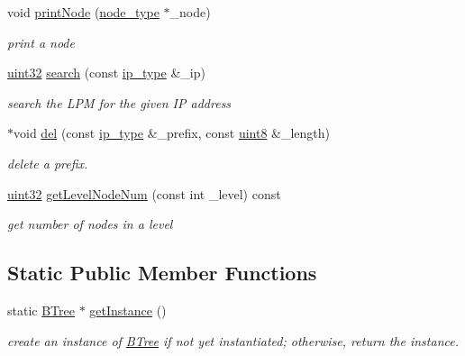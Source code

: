 \begin{DoxyCompactItemize}
void \hyperlink{classBTree_a5f59b125f5a9cca15da6382f591925d5}{print\-Node} (\hyperlink{classBTree_a6868250b9b4cb60d672f2c83be3889f4}{node\-\_\-type} $\ast$\-\_\-node)
\begin{DoxyCompactList}\small\item\em print a node \end{DoxyCompactList}\item 
\hyperlink{types_8h_abd01e8e67e3d94cab04ecaaf4f85ac1b}{uint32} \hyperlink{classBTree_a9038cb74603e7611e66b8e40418427ad}{search} (const \hyperlink{classBTree_a01d338c5749bb49768463706d9d2141c}{ip\-\_\-type} \&\-\_\-ip)
\begin{DoxyCompactList}\small\item\em search the L\-P\-M for the given I\-P address \end{DoxyCompactList}\item 
$\ast$void \hyperlink{classBTree_ab4a07c1c6df85fb7d74f9f40b6c4aea7}{del} (const \hyperlink{classBTree_a01d338c5749bb49768463706d9d2141c}{ip\-\_\-type} \&\-\_\-prefix, const \hyperlink{types_8h_a34ecedcf03a70dc91e4616212d79267d}{uint8} \&\-\_\-length)
\begin{DoxyCompactList}\small\item\em delete a prefix. \end{DoxyCompactList}\item 
\hyperlink{types_8h_abd01e8e67e3d94cab04ecaaf4f85ac1b}{uint32} \hyperlink{classBTree_a6b031aeb6296d188f86a4de271184458}{get\-Level\-Node\-Num} (const int \-\_\-level) const 
\begin{DoxyCompactList}\small\item\em get number of nodes in a level \end{DoxyCompactList}\end{DoxyCompactItemize}
\subsection*{Static Public Member Functions}
\begin{DoxyCompactItemize}
\item 
static \hyperlink{classBTree}{B\-Tree} $\ast$ \hyperlink{classBTree_a242001054313db865876bda2ebcd274e}{get\-Instance} ()
\begin{DoxyCompactList}\small\item\em create an instance of \hyperlink{classBTree}{B\-Tree} if not yet instantiated; otherwise, return the instance. \end{DoxyCompactList}\end{DoxyCompactItemize}
